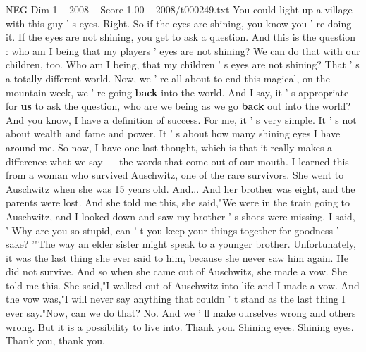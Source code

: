 \begin{textsample}{NEG Dim 1 – 2008 – Score 1.00 – 2008/t000249.txt}
You could light up a village with this guy ' s eyes.
Right.
So if the eyes are shining, you know you ' re doing it.
If the eyes are not shining, you get to ask a question.
And this is the question : who am I being that my players ' eyes are not shining?
We can do that with our children, too.
Who am I being, that my children ' s eyes are not shining?
That ' s a totally different world.
Now, we ' re all about to end this magical, on-the-mountain week, we ' re going \textbf{back} into the world.
And I say, it ' s appropriate for \textbf{us} to ask the question, who are we being as we go \textbf{back} out into the world?
And you know, I have a definition of success.
For me, it ' s very simple.
It ' s not about wealth and fame and power.
It ' s about how many shining eyes I have around me.
So now, I have one last thought, which is that it really makes a difference what we say — the words that come out of our mouth.
I learned this from a woman who survived Auschwitz, one of the rare survivors.
She went to Auschwitz when she was 15 years old.
And...
And her brother was eight, and the parents were lost.
And she told me this, she said,"We were in the train going to Auschwitz, and I looked down and saw my brother ' s shoes were missing.
I said, ' Why are you so stupid, can ' t you keep your things together for goodness ' sake? '"The way an elder sister might speak to a younger brother.
Unfortunately, it was the last thing she ever said to him, because she never saw him again.
He did not survive.
And so when she came out of Auschwitz, she made a vow.
She told me this.
She said,"I walked out of Auschwitz into life and I made a vow.
And the vow was,"I will never say anything that couldn ' t stand as the last thing I ever say."Now, can we do that?
No.
And we ' ll make ourselves wrong and others wrong.
But it is a possibility to live into.
Thank you.
Shining eyes.
Shining eyes.
Thank you, thank you.

\end{textsample}
